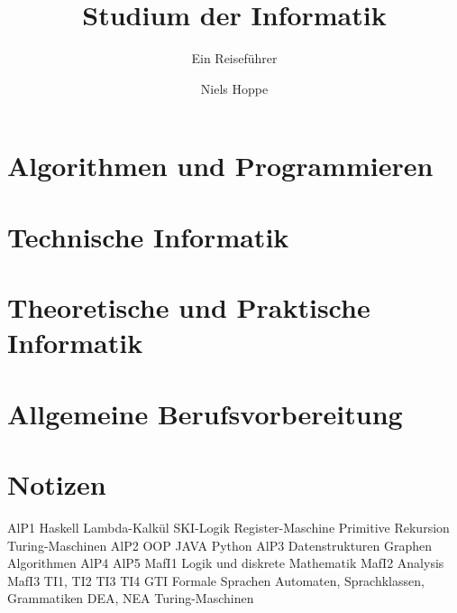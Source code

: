 \documentclass[german]{scrbook}
\title{Studium der Informatik}
\subtitle{Ein Reiseführer}
\author{Niels Hoppe}
\begin{document}
\maketitle
\tableofcontents

\part{Algorithmen und Programmieren}


%

\part{Technische Informatik}


\part{Theoretische und Praktische Informatik}


\part{Allgemeine Berufsvorbereitung}


\part{Notizen}

AlP1
	Haskell
	Lambda-Kalkül
	SKI-Logik
	Register-Maschine
	Primitive Rekursion
	Turing-Maschinen
AlP2
	OOP
	JAVA
	Python
AlP3
	Datenstrukturen
	Graphen
	Algorithmen
AlP4
AlP5
MafI1
	Logik und diskrete Mathematik
MafI2
	Analysis
MafI3
TI1, TI2
TI3
TI4
GTI
	Formale Sprachen
	Automaten, Sprachklassen, Grammatiken
	DEA, NEA
	Turing-Maschinen

{}

\end{document}
